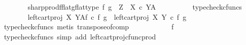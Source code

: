 \begin{isabellebody}
\ \ \ \ \ \ \isamarkupfalse%
\ sharp{\isacharunderscore}{\kern0pt}prod{\isacharunderscore}{\kern0pt}fflat{\isacharunderscore}{\kern0pt}gflat{\isacharunderscore}{\kern0pt}type{\isacharcolon}{\kern0pt}\ {\isachardoublequoteopen}{\isasymlangle}f\isactrlsup {\isasymflat}\ {\isacharcomma}{\kern0pt}g\isactrlsup {\isasymflat}{\isasymrangle}\isactrlsup {\isasymsharp}\ {\isacharcolon}{\kern0pt}\ Z\ {\isasymrightarrow}\ {\isacharparenleft}{\kern0pt}X\ {\isasymtimes}\isactrlsub c\ Y{\isacharparenright}{\kern0pt}\isactrlbsup A\isactrlesup {\isachardoublequoteclose}\isanewline
\ \ \ \ \ \ \ \ \isamarkupfalse%
\ typecheck{\isacharunderscore}{\kern0pt}cfuncs\isanewline
\ \ \ \ \ \ \isamarkupfalse%
\ {\isachardoublequoteopen}{\isacharparenleft}{\kern0pt}{\isacharparenleft}{\kern0pt}left{\isacharunderscore}{\kern0pt}cart{\isacharunderscore}{\kern0pt}proj\ X\ Y{\isacharparenright}{\kern0pt}\isactrlbsup A\isactrlesup \isactrlsub f{\isacharparenright}{\kern0pt}\ {\isasymcirc}\isactrlsub c\ {\isasymlangle}f\isactrlsup {\isasymflat}\ {\isacharcomma}{\kern0pt}g\isactrlsup {\isasymflat}{\isasymrangle}\isactrlsup {\isasymsharp}\ {\isacharequal}{\kern0pt}\ {\isacharparenleft}{\kern0pt}{\isacharparenleft}{\kern0pt}left{\isacharunderscore}{\kern0pt}cart{\isacharunderscore}{\kern0pt}proj\ X\ Y{\isacharparenright}{\kern0pt}\ {\isasymcirc}\isactrlsub c\ {\isasymlangle}f\isactrlsup {\isasymflat}\ {\isacharcomma}{\kern0pt}g\isactrlsup {\isasymflat}{\isasymrangle}{\isacharparenright}{\kern0pt}\isactrlsup {\isasymsharp}{\isachardoublequoteclose}\isanewline
\ \ \ \ \ \ \ \ \isamarkupfalse%
\ {\isacharparenleft}{\kern0pt}typecheck{\isacharunderscore}{\kern0pt}cfuncs{\isacharcomma}{\kern0pt}\ metis\ transpose{\isacharunderscore}{\kern0pt}of{\isacharunderscore}{\kern0pt}comp{\isacharparenright}{\kern0pt}\isanewline
\ \ \ \ \ \ \isamarkupfalse%
\ \isamarkupfalse%
\ {\isachardoublequoteopen}{\isachardot}{\kern0pt}{\isachardot}{\kern0pt}{\isachardot}{\kern0pt}\ {\isacharequal}{\kern0pt}\ f\isactrlsup {\isasymflat}\isactrlsup {\isasymsharp}{\isachardoublequoteclose}\isanewline
\ \ \ \ \ \ \ \ \isamarkupfalse%
\ {\isacharparenleft}{\kern0pt}typecheck{\isacharunderscore}{\kern0pt}cfuncs{\isacharcomma}{\kern0pt}\ simp\ add{\isacharcolon}{\kern0pt}\ left{\isacharunderscore}{\kern0pt}cart{\isacharunderscore}{\kern0pt}proj{\isacharunderscore}{\kern0pt}cfunc{\isacharunderscore}{\kern0pt}prod{\isacharparenright}{\kern0pt}\isanewline
\ \ \ \ \ \ \isamarkupfalse%
\ \isamarkupfalse%

\end{isabellebody}
